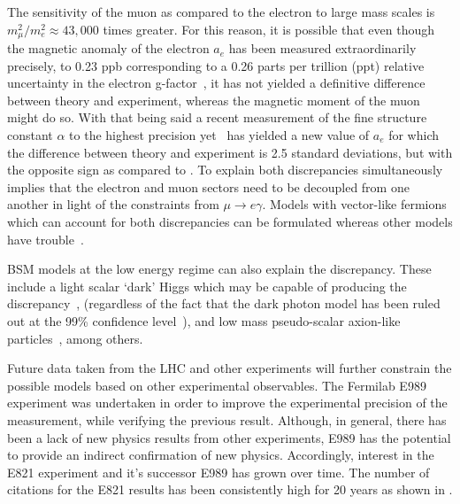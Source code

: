 The sensitivity of the muon as compared to the electron to large mass scales is $ m_{\mu}^{2} / m_{e}^{2} \approx 43,000$ times greater. For this reason, it is possible that even though the magnetic anomaly of the electron $a_{e}$ has been measured extraordinarily precisely, to 0.23 ppb corresponding to a 0.26 parts per trillion (ppt) relative uncertainty in the electron g-factor~\cite{CODATA,ElectronMDM}, it has not yielded a definitive difference between theory and experiment, whereas the magnetic moment of the muon might do so. With that being said a recent measurement of the fine structure constant $\alpha$ to the highest precision yet~\cite{finestructureBerkeley} has yielded a new value of $a_{e}$ for which the difference between theory and experiment is 2.5 standard deviations, but with the opposite sign as compared to \amu. To explain both discrepancies simultaneously implies that the electron and muon sectors need to be decoupled from one another in light of the constraints from $\mu \rightarrow e\gamma$. Models with vector-like fermions which can account for both discrepancies can be formulated whereas other models have trouble~\cite{PhysRevD.98.113002}.



BSM models at the low energy regime can also explain the discrepancy. These include a light scalar `dark' Higgs which may be capable of producing the discrepancy~\cite{Chen:2015vqy}, (regardless of the fact that the dark photon model has been ruled out at the 99\% confidence level~\cite{Ablikim:2017aab}), and low mass pseudo-scalar axion-like particles~\cite{Marciano_2016}, among others.



Future data taken from the LHC and other experiments will further constrain the possible models based on other experimental observables. The Fermilab E989 experiment was undertaken in order to improve the experimental precision of the \amu measurement, while verifying the previous result. Although, in general, there has been a lack of new physics results from other experiments, E989 has the potential to provide an indirect confirmation of new physics. Accordingly, interest in the E821 experiment and it's successor E989 has grown over time. The number of citations for the E821 results has been consistently high for 20 years as shown in .




